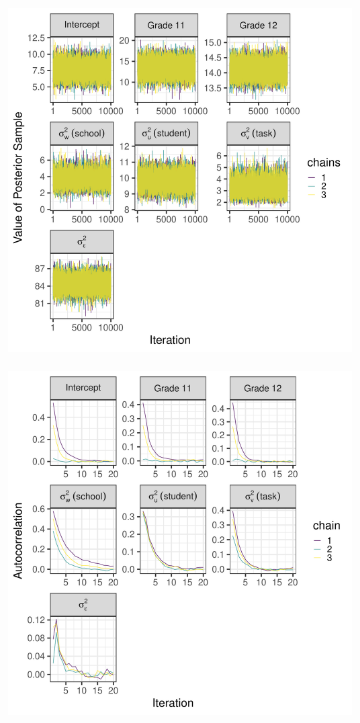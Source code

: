 \documentclass[a4paper]{article}
\begin{document}
\begin{figure}[!ht]
	\centering
	\begin{subfigure}{.5\textwidth}
		\centering
		\includegraphics[width=\linewidth]{baselineTraceplots.pdf}
	\end{subfigure}%
	\begin{subfigure}{.5\textwidth}
		\centering
		\includegraphics[width=\linewidth]{baselineAutocorrelationplots.pdf}

\end{subfigure}
\end{figure}
\end{document}
